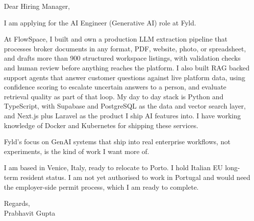 \documentclass[a4paper,11pt]{article}
\begin{document}
Dear Hiring Manager,

I am applying for the AI Engineer (Generative AI) role at Fyld.

At FlowSpace, I built and own a production LLM extraction pipeline that processes broker documents in any format, PDF, website, photo, or spreadsheet, and drafts more than 900 structured workspace listings, with validation checks and human review before anything reaches the platform. I also built RAG backed support agents that answer customer questions against live platform data, using confidence scoring to escalate uncertain answers to a person, and evaluate retrieval quality as part of that loop. My day to day stack is Python and TypeScript, with Supabase and PostgreSQL as the data and vector search layer, and Next.js plus Laravel as the product I ship AI features into. I have working knowledge of Docker and Kubernetes for shipping these services.

Fyld's focus on GenAI systems that ship into real enterprise workflows, not experiments, is the kind of work I want more of.

I am based in Venice, Italy, ready to relocate to Porto. I hold Italian EU long-term resident status. I am not yet authorised to work in Portugal and would need the employer-side permit process, which I am ready to complete.

Regards,\\
Prabhavit Gupta
\end{document}
